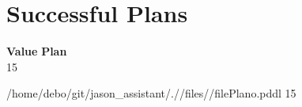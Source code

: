 \documentclass[a4paper,12pt]{article}
\begin{document}
\section{Successful Plans}
\begin{tabbing}
{\bf Value} \qquad \= {\bf Plan}\\[0.8ex]
15 \>\begin{minipage}[t]{12cm} /\-home/\-debo/\-git/\-jason\_assistant/\-./\-/\-files/\-/\-filePlano.pddl 15  \end{minipage}\\
 \>\\
\end{tabbing}
\end{document}
